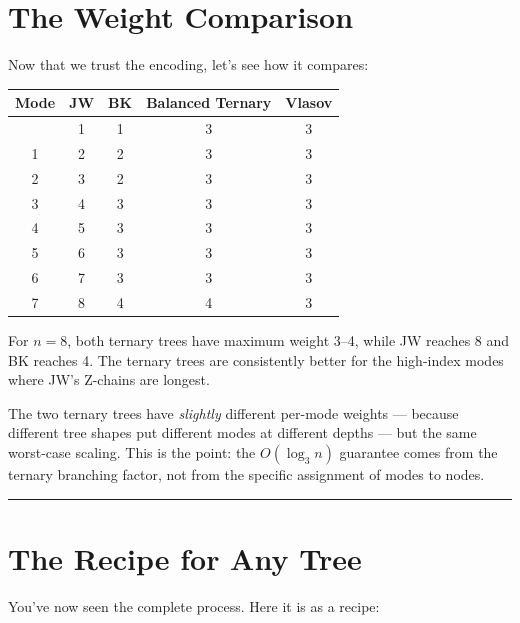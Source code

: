 \documentclass[
  11pt,
  oneside]{book}
\begin{document}
\section{The Weight Comparison}\label{the-weight-comparison}

Now that we trust the encoding, let's see how it compares:

\begin{longtable}[]{@{}ccccc@{}}
\toprule\noalign{}
Mode & JW & BK & Balanced Ternary & Vlasov \\
\midrule\noalign{}
\endhead
\bottomrule\noalign{}
\endlastfoot
0 & 1 & 1 & 3 & 3 \\
1 & 2 & 2 & 3 & 3 \\
2 & 3 & 2 & 3 & 3 \\
3 & 4 & 3 & 3 & 3 \\
4 & 5 & 3 & 3 & 3 \\
5 & 6 & 3 & 3 & 3 \\
6 & 7 & 3 & 3 & 3 \\
7 & 8 & 4 & 4 & 3 \\
\end{longtable}

For \(n = 8\), both ternary trees have maximum weight 3--4, while JW
reaches 8 and BK reaches 4. The ternary trees are consistently better
for the high-index modes where JW's Z-chains are longest.

The two ternary trees have \emph{slightly} different per-mode weights
--- because different tree shapes put different modes at different
depths --- but the same worst-case scaling. This is the point: the
\(O(\log_3 n)\) guarantee comes from the ternary branching factor, not
from the specific assignment of modes to nodes.

\begin{center}\rule{0.5\linewidth}{0.5pt}\end{center}

\section{The Recipe for Any Tree}\label{the-recipe-for-any-tree}

You've now seen the complete process. Here it is as a recipe:
\end{document}
